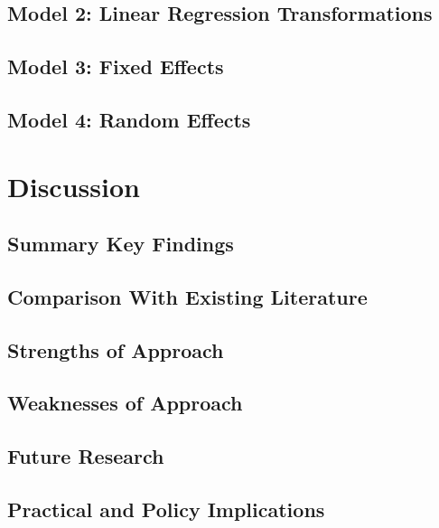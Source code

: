 \documentclass[
]{article}
\begin{document}
\subsection{Model 2: Linear Regression Transformations}\label{model-2-linear-regression-transformations}

\subsection{Model 3: Fixed Effects}\label{model-3-fixed-effects}

\subsection{Model 4: Random Effects}\label{model-4-random-effects}

\newpage

\section{Discussion}\label{discussion}

\subsection{Summary Key Findings}\label{summary-key-findings}

\subsection{Comparison With Existing Literature}\label{comparison-with-existing-literature}

\subsection{Strengths of Approach}\label{strengths-of-approach}

\subsection{Weaknesses of Approach}\label{weaknesses-of-approach}

\subsection{Future Research}\label{future-research}

\subsection{Practical and Policy Implications}\label{practical-and-policy-implications}
\end{document}
